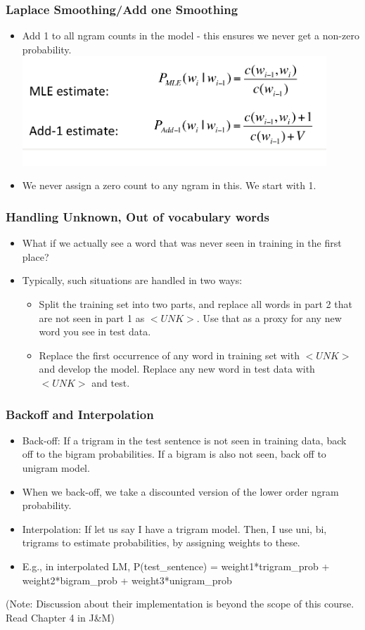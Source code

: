 \documentclass{beamer}
\begin{document}
\begin{frame}
\frametitle{Laplace Smoothing/Add one Smoothing}
\begin{itemize}
\item Add 1 to all ngram counts in the model - this ensures we never get a non-zero probability.
\includegraphics[width=0.9\textwidth]{add1.png}
\item We never assign a zero count to any ngram in this. We start with 1.
\end{itemize}
\end{frame}

\begin{frame}
\frametitle{Handling Unknown, Out of vocabulary words}
\begin{itemize}
\item What if we actually see a word that was never seen in training in the first place? \pause
\item Typically, such situations are handled in two ways:
\begin{itemize}
\item Split the training set into two parts, and replace all words in part 2 that are not seen in part 1 as $<UNK>$. Use that as a proxy for any new word you see in test data.
\item Replace the first occurrence of any word in training set with $<UNK>$ and develop the model. Replace any new word in test data with $<UNK>$ and test.
\end{itemize}
\end{itemize}
\end{frame}

\begin{frame}
\frametitle{Backoff and Interpolation}
\begin{itemize}
\item Back-off: If a trigram in the test sentence is not seen in training data, back off to the bigram probabilities. If a bigram is also not seen, back off to unigram model. 
\item When we back-off, we take a discounted version of the lower order ngram probability.
\item Interpolation: If let us say I have a trigram model. Then, I use uni, bi, trigrams to estimate probabilities, by assigning weights to these.
\item E.g., in interpolated LM, P(test\_sentence) = weight1*trigram\_prob + weight2*bigram\_prob + weight3*unigram\_prob
\end{itemize}
(Note: Discussion about their implementation is beyond the scope of this course. Read Chapter 4 in J\&M)
\end{frame}
\end{document}

